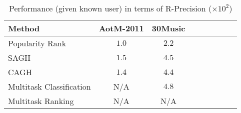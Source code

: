 \begin{table}[!h]
\centering
\caption{Performance (given known user) in terms of R-Precision ($\times 10^2$)}
\label{tab:perf_plgen1_r-precision}
\begin{tabular}{l*{4}{c}*{4}{c}}
\toprule
Method     & AotM-2011 & 30Music \\
\midrule
Popularity Rank &     $1.0$ &   $2.2$ \\
SAGH &     $1.5$ &   $4.5$ \\
CAGH &     $1.4$ &   $4.4$ \\
Multitask Classification &       N/A &   $4.8$ \\
Multitask Ranking &       N/A &     N/A \\
\bottomrule
\end{tabular}
\end{table}
